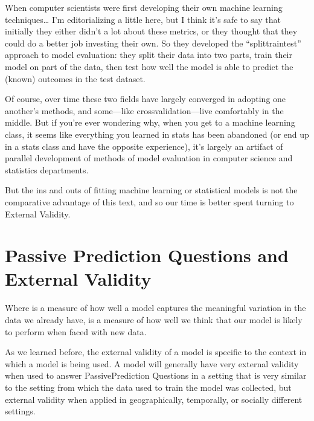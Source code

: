 \documentclass[letterpaper,10pt,english]{jupyterBook}
\begin{document}
\sphinxAtStartPar
When computer scientists were first developing their own machine learning techniques… I’m editorializing a little here, but I think it’s safe to say that initially they either didn’t  a lot about these metrics, or they thought that they could do a better job investing their own. So they developed the “split\sphinxhyphen{}train\sphinxhyphen{}test” approach to model evaluation: they split their data into two parts, train their model on part of the data, then test how well the model is able to predict the (known) outcomes in the test dataset.

\sphinxAtStartPar
Of course, over time these two fields have largely converged in adopting one another’s methods, and some—like cross\sphinxhyphen{}validation—live comfortably in the middle. But if you’re ever wondering why, when you get to a machine learning class, it seems like everything you learned in stats has been abandoned (or end up in a stats class and have the opposite experience), it’s largely an artifact of parallel development of methods of model evaluation in computer science and statistics departments.

\sphinxAtStartPar
But the ins and outs of fitting machine learning or statistical models is not the comparative advantage of this text, and so our time is better spent turning to External Validity.

\sphinxstepscope


\section{Passive Prediction Questions and External Validity}
\label{\detokenize{30_questions/24_passive_prediction_external:passive-prediction-questions-and-external-validity}}\label{\detokenize{30_questions/24_passive_prediction_external::doc}}
\sphinxAtStartPar
Where  is a measure of how well a model captures the meaningful variation in the data we already have,  is a measure of how well we think that our model is likely to perform when faced with new data.

\sphinxAtStartPar
As we learned before, the external validity of a model is specific to the context in which a model is being used. A model will generally have very  external validity when used to answer Passive\sphinxhyphen{}Prediction Questions in a setting that is very similar to the setting from which the data used to train the model was collected, but  external validity when applied in geographically, temporally, or socially different settings.
\end{document}
